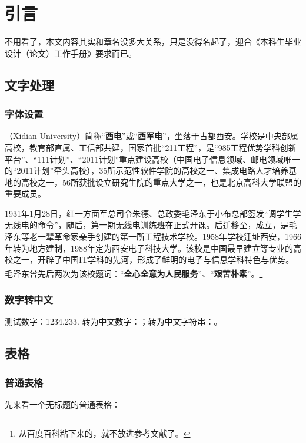 \chapter{引言}
不用看了，本文内容其实和章名没多大关系，只是没得名起了，迎合《本科生毕业设计（论文）工作手册》要求而已。

\section{文字处理}

\subsection{字体设置}
\textbf{}（Xidian University）简称“\textbf{西电}”或“\textbf{西军电}”，坐落于古都西安。学校是中央部属高校，教育部直属、工信部共建，国家首批“{\heiti 211工程}”，是“{\fangsong 985工程优势学科创新平台}”、“111计划”、“2011计划”重点建设高校{\youyuan （中国电子信息领域、邮电领域唯一的“2011计划”牵头高校）}，35所示范性软件学院的高校之一、集成电路人才培养基地的高校之一，56所获批设立研究生院的重点大学之一，也是{\lishu 北京高科大学联盟}的重要成员。 

1931年1月28日，红一方面军{\yahei 总司令朱德、总政委毛泽东}于小布总部签发“调学生学无线电的命令”，随后，第一期无线电训练班在正式开课。后迁移至，成立，是毛泽东等老一辈革命家亲手创建的第一所工程技术学校。1958年学校迁址西安，1966年转为地方建制，1988年定为西安电子科技大学。该校是中国最早建立等专业的高校之一，开辟了中国IT学科的先河，形成了鲜明的电子与信息学科特色与优势。毛泽东曾先后两次为该校题词：“\textbf{\large 全心全意为人民服务}”、“\textbf{\large 艰苦朴素}”。\footnote{从百度百科粘下来的，就不放进参考文献了。}


\subsection{数字转中文}
 测试数字：1234.233. 转为中文数字：；转为中文字符串：。

\section{表格}

\subsection{普通表格}
先来看一个无标题的普通表格：

